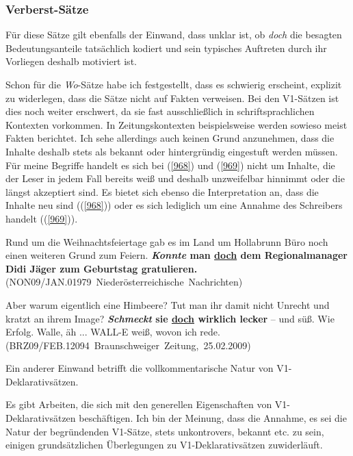 {\subsubsection{Verberst-Sätze}
Für diese Sätze gilt ebenfalls der Einwand, dass unklar ist, ob \textit{doch} die besagten Bedeutungsanteile tatsächlich kodiert und sein typisches Auftreten durch ihr Vorliegen deshalb motiviert ist.

Schon für die \textit{Wo}-Sätze habe ich festgestellt, dass es schwierig erscheint, explizit zu widerlegen, dass die Sätze nicht auf Fakten verweisen. Bei den V1-Sätzen ist dies noch weiter erschwert, da sie fast ausschließlich in schriftsprachlichen Kontexten vorkommen. In Zeitungskontexten beispielsweise werden sowieso meist Fakten berichtet. Ich sehe allerdings auch keinen Grund anzunehmen, dass die Inhalte deshalb stets als bekannt oder hintergründig eingestuft werden müssen. Für meine Begriffe handelt es sich bei (\ref{968}) und (\ref{969}) nicht um Inhalte, die der Leser in jedem Fall bereits weiß und deshalb unzweifelbar hinnimmt oder die längst akzeptiert sind. Es bietet sich ebenso die Interpretation an, dass die Inhalte neu sind ((\ref{968})) oder es sich lediglich um eine Annahme des Schreibers handelt ((\ref{969})).
	
\begin{exe}
	\ex\label{968}
	\scriptsize
	Rund um die Weihnachtsfeiertage gab es im Land um Hollabrunn Büro noch einen weiteren Grund zum Feiern. \textbf{\textit{Konnte} man \underline{doch} 		dem Regionalmanager Didi Jäger zum Geburtstag gratulieren.}
	\newline
	\hbox{}\hfill\hbox{(NON09/JAN.01979 Niederösterreichische Nachrichten)}
\end{exe}	

\begin{exe}
	\ex\label{969}
	\scriptsize
	Aber warum eigentlich eine Himbeere? Tut man ihr damit nicht Unrecht und kratzt an ihrem Image? \textbf{\textit{Schmeckt} sie \underline{doch} wirklich 	lecker} – und süß. Wie Erfolg. Walle, äh ... \glqq WALL-E\grqq{} weiß, wovon ich rede.
	\hfill\hbox{(BRZ09/FEB.12094 Braunschweiger Zeitung, 25.02.2009)}
\end{exe}
Ein anderer Einwand betrifft die vollkommentarische Natur  von V1-Deklarativ\-sätzen. 

Es gibt Arbeiten, die sich mit den generellen Eigenschaften von V1-Deklara\-tivsätzen beschäftigen. Ich bin der Meinung, dass die Annahme, es sei die Natur der begründenden V1-Sätze, stets unkontrovers, bekannt etc. zu sein, einigen grundsätz\-lichen Überlegungen zu V1-Deklarativsätzen zuwiderläuft.

}
